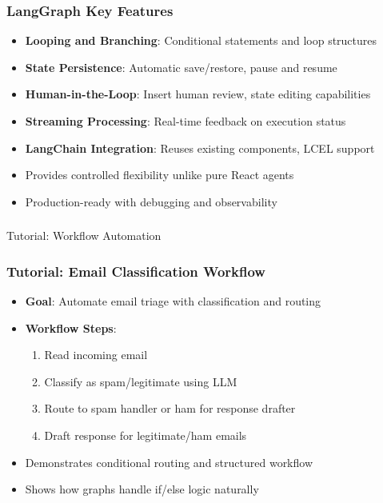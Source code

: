 \begin{frame}[fragile]\frametitle{LangGraph Key Features}
      \begin{itemize}
        \item \textbf{Looping and Branching}: Conditional statements and loop structures
        \item \textbf{State Persistence}: Automatic save/restore, pause and resume
        \item \textbf{Human-in-the-Loop}: Insert human review, state editing capabilities
        \item \textbf{Streaming Processing}: Real-time feedback on execution status
        \item \textbf{LangChain Integration}: Reuses existing components, LCEL support
        \item Provides controlled flexibility unlike pure React agents
        \item Production-ready with debugging and observability
      \end{itemize}
\end{frame}


\begin{frame}[fragile]\frametitle{}
\begin{center}
{\Large Tutorial: Workflow Automation}
\end{center}
\end{frame}



\begin{frame}[fragile]\frametitle{Tutorial: Email Classification Workflow}
      \begin{itemize}
        \item \textbf{Goal}: Automate email triage with classification and routing
        \item \textbf{Workflow Steps}:
        \begin{enumerate}
            \item Read incoming email
            \item Classify as spam/legitimate using LLM
            \item Route to spam handler or ham for response drafter
            \item Draft response for legitimate/ham emails
        \end{enumerate}
        \item Demonstrates conditional routing and structured workflow
        \item Shows how graphs handle if/else logic naturally
      \end{itemize}
\end{frame}

